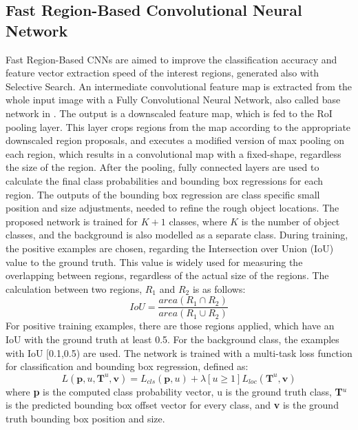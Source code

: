 \subsection{Fast Region-Based Convolutional Neural Network}\label{s:fastrcnn}
Fast Region-Based CNNs \cite{Girshick:2016:RCN:2881668.2882239} are aimed to improve the classification accuracy and feature vector extraction speed of the interest regions, generated also with Selective Search. An intermediate convolutional feature map is extracted from the whole input image with a Fully Convolutional Neural Network, also called base network in \citep{journals/corr/SermanetEZMFL13}. The output is a downscaled feature map, which is fed to the RoI pooling layer. This layer crops regions from the map according to the appropriate downscaled region proposals, and executes a modified version of max pooling on each region, which results in a convolutional map with a fixed-shape, regardless the size of the region.
\bigbreak
After the pooling, fully connected layers are used to calculate the final class probabilities and bounding box regressions for each region. The outputs of the bounding box regression are class specific small position and size adjustments, needed to refine the rough object locations.
\bigbreak
The proposed network is trained for $K+1$ classes, where $K$ is the number of object classes, and the background is also modelled as a separate class. During training, the positive examples are chosen, regarding the Intersection over Union (IoU) value to the ground truth. This value is widely used for measuring the overlapping between regions, regardless of the actual size of the regions. The calculation between two regions, $R_1$ and $R_2$ is as follows:
\bigbreak
\begin{equation}
        \mathit{IoU} = \frac{\mathit{area}( R_1 \cap R_2 )}{\mathit{area} ( R_1 \cup R_2 )}
        \label{eq:iou}
\end{equation}
\bigbreak
For positive training examples, there are those regions applied, which have an IoU with the ground truth at least 0.5. For the background class, the examples with IoU [0.1,0.5) are used.
\bigbreak
The network is trained with a multi-task loss function for classification and bounding box regression, defined as:
\bigbreak
\begin{equation}\label{eq:frcnn-loss}
	L(\mathbf{p}, u, \mathbf{T}^u, \mathbf{v}) = L_{cls}(\mathbf{p}, u) + \lambda [u \ge 1] L_{loc}(\mathbf{T}^u, \mathbf{v})
\end{equation}
\bigbreak
where \textbf{p} is the computed class probability vector, u is the ground truth class, \textbf{T}$^u$ is the predicted bounding box offset vector for every class, and \textbf{v} is the ground truth bounding box position and size.

